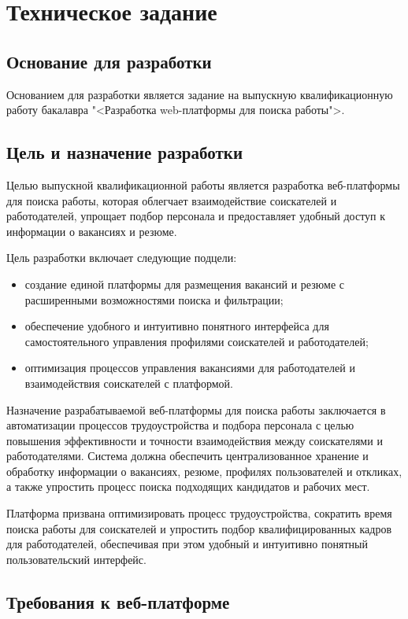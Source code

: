 \section{Техническое задание}
\subsection{Основание для разработки}

Основанием для разработки является задание на выпускную квалификационную работу бакалавра "<Разработка web-платформы для поиска работы">.

\subsection{Цель и назначение разработки}

Целью выпускной квалификационной работы является разработка веб-платформы для поиска работы, которая облегчает взаимодействие соискателей и работодателей, упрощает подбор персонала и предоставляет удобный доступ к информации о вакансиях и резюме. 

Цель разработки включает следующие подцели:
\begin{itemize}
	\item создание единой платформы для размещения вакансий и резюме с расширенными возможностями поиска и фильтрации;
	\item обеспечение удобного и интуитивно понятного интерфейса для самостоятельного управления профилями соискателей и работодателей;
	\item оптимизация процессов управления вакансиями для работодателей и взаимодействия соискателей с платформой.
\end{itemize}

Назначение разрабатываемой веб-платформы для поиска работы заключается в автоматизации процессов трудоустройства и подбора персонала с целью повышения эффективности и точности взаимодействия между соискателями и работодателями. Система должна обеспечить централизованное хранение и обработку информации о вакансиях, резюме, профилях пользователей и откликах, а также упростить процесс поиска подходящих кандидатов и рабочих мест.

Платформа призвана оптимизировать процесс трудоустройства, сократить время поиска работы для соискателей и упростить подбор квалифицированных кадров для работодателей, обеспечивая при этом удобный и интуитивно понятный пользовательский интерфейс.


\subsection{Требования к веб-платформе}

